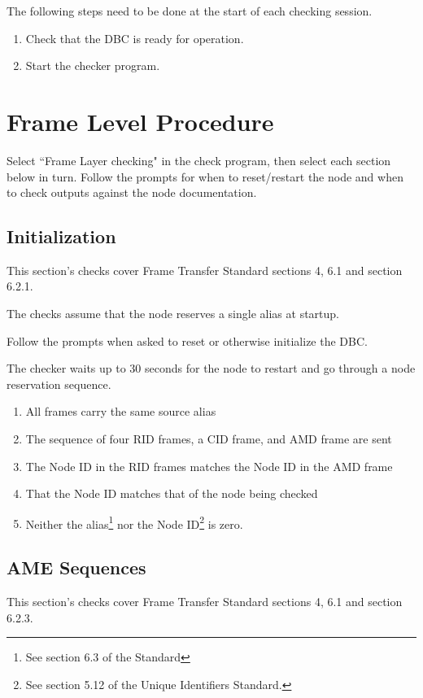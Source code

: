\documentclass[11pt]{article}
\begin{document}
The following steps need to be done at the start of each checking session.
\begin{enumerate}
\item Check that the DBC is ready for operation.
\item Start the checker program.
\end{enumerate}

\section{Frame Level Procedure}

Select ``Frame Layer checking" in the check program, 
then select each section below in turn.  Follow the prompts
for when to reset/restart the node and when to check 
outputs against the node documentation.

\subsection{Initialization}

This section's checks cover Frame Transfer Standard sections 4, 6.1 and section 6.2.1.

The checks assume that the node reserves a single alias at startup.

Follow the prompts when asked to reset or otherwise initialize the DBC.

The checker waits up to 30 seconds for the node to restart and 
go through a node reservation sequence.

\begin{enumerate}
\item All frames carry the same source alias
\item The sequence of four RID frames, a CID frame, and AMD frame are sent
\item The Node ID in the RID frames matches the Node ID in the AMD frame
\item That the Node ID matches that of the node being checked
\item Neither the alias\footnote{See section 6.3 of the Standard} 
nor the Node ID\footnote{See section 5.12 of the Unique Identifiers Standard.}
is zero.
\end{enumerate}


\subsection{AME Sequences}

This section's checks cover Frame Transfer Standard sections 4, 6.1 and section 6.2.3.
\end{document}
